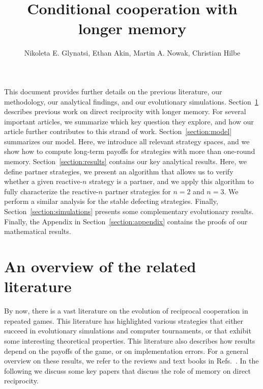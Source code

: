 \documentclass[9pt,twoside,lineno]{pnas-new}
\title{Conditional cooperation with longer memory}
\author{Nikoleta E. Glynatsi, Ethan Akin, Martin A. Nowak, Christian Hilbe}
\theoremstyle{plainCl1}
\theoremstyle{plainCl2}
\begin{document}
\maketitle

\SItext

This document provides further details on the previous literature, our methodology, our analytical
findings, and our evolutionary simulations.
Section~\ref{section:literature} describes previous work on direct reciprocity with longer memory. 
For several important articles, we summarize which key question they explore, and how our article further contributes to this strand of work. 
Section~\ref{section:model} summarizes our model. 
Here, we introduce all relevant strategy spaces, and we show how to compute long-term payoffs for strategies with more than one-round memory. 
Section~\ref{section:results} contains our key analytical results. 
Here, we define partner strategies, we present an algorithm that allows us to verify whether a given reactive-$n$ strategy is a partner, and we apply this algorithm to fully characterize the reactive-$n$ partner strategies for $n\!=\!2$ and $n\!=\!3$.
We perform a similar analysis for the stable defecting strategies. 
Finally, Section~\ref{section:simulations} presents some complementary evolutionary results. 
Finally, the Appendix in Section~\ref{section:appendix} contains the proofs of our mathematical results. 




\section{An overview of the related literature}\label{section:literature}

By now, there is a vast literature on the evolution of reciprocal cooperation in repeated games. 
This literature has highlighted various strategies that either succeed in evolutionary simulations and computer tournaments, or that exhibit some interesting theoretical properties. 
This literature also describes how results depend on the payoffs of the game, or on implementation errors. 
For a general overview on these results, we refer to the reviews and text books in Refs.~\cite{axelrod:book:1984,nowak:book:2006,sigmund2010,hilbe:Nature:2018,Glynatsi:HSSC:2021}. 
In the following we discuss some key papers that discuss the role of memory on direct reciprocity.
\end{document}
